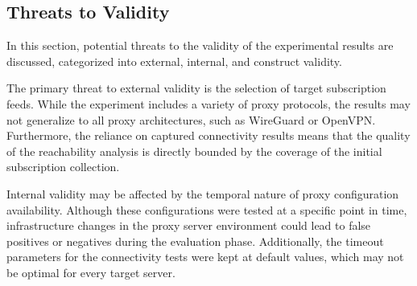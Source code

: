 \documentclass[10pt,conference]{IEEEtran}
\begin{document}
\begin{table}[t]
\centering
\caption{Comparative analysis of features across proxy protocol testing tools.}
\label{tab:proto_tester_comparison}
\renewcommand{\arraystretch}{1.4}
\end{table}

\subsection{Threats to Validity}
In this section, potential threats to the validity of the experimental results are discussed, categorized into external, internal, and construct validity.

The primary threat to external validity is the selection of target subscription feeds.
While the experiment includes a variety of proxy protocols, the results may not generalize to all proxy architectures, such as WireGuard or OpenVPN.
Furthermore, the reliance on captured connectivity results means that the quality of the reachability analysis is directly bounded by the coverage of the initial subscription collection.

Internal validity may be affected by the temporal nature of proxy configuration availability.
Although these configurations were tested at a specific point in time, infrastructure changes in the proxy server environment could lead to false positives or negatives during the evaluation phase.
Additionally, the timeout parameters for the connectivity tests were kept at default values, which may not be optimal for every target server.
\end{document}
